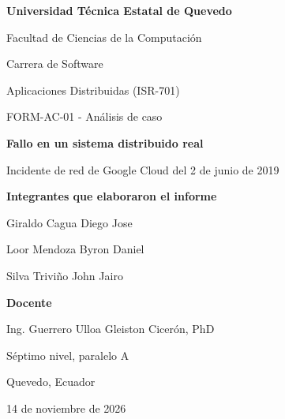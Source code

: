 \documentclass[10pt]{article}
\begin{document}
\begin{titlepage}
\centering
{\Large\bfseries Universidad Técnica Estatal de Quevedo\par}
\medskip
Facultad de Ciencias de la Computación\par
Carrera de Software\par
\vfill
{\Large Aplicaciones Distribuidas (ISR-701)\par}
\medskip
{\large FORM-AC-01 - Análisis de caso\par}
\medskip
{\LARGE\bfseries Fallo en un sistema distribuido real\par}
\medskip
{\large Incidente de red de Google Cloud del 2 de junio de 2019\par}
\vfill
\textbf{Integrantes que elaboraron el informe}\par
{\large Giraldo Cagua Diego Jose\par
Loor Mendoza Byron Daniel\par
Silva Triviño John Jairo\par}
\bigskip
\textbf{Docente}\par
Ing. Guerrero Ulloa Gleiston Cicerón, PhD\par
\medskip
Séptimo nivel, paralelo A\par
\vfill
Quevedo, Ecuador\par
14 de noviembre de 2026\par
\end{titlepage}

\begingroup
\small
\setlength{\parskip}{0pt}
\setlength{\columnsep}{16pt}
\setlength{\floatsep}{6pt}
\setlength{\textfloatsep}{7pt}
\setlength{\intextsep}{7pt}
\end{document}
